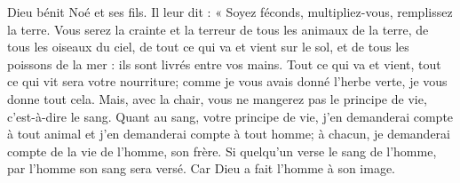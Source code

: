 Dieu bénit Noé et ses fils.
Il leur dit : « Soyez féconds, multipliez-vous, remplissez la terre.
Vous serez la crainte et la terreur de tous les animaux de la terre,
	de tous les oiseaux du ciel, de tout ce qui va et vient sur le sol,
	et de tous les poissons de la mer : ils sont livrés entre vos mains.
Tout ce qui va et vient, tout ce qui vit sera votre nourriture;
	comme je vous avais donné l’herbe verte, je vous donne tout cela.
Mais, avec la chair, vous ne mangerez pas le principe de vie,
	c’est-à-dire le sang.
Quant au sang, votre principe de vie, j’en demanderai compte à tout animal
	et j’en demanderai compte à tout homme;
	à chacun, je demanderai compte de la vie de l’homme, son frère.
Si quelqu’un verse le sang de l’homme, par l’homme son sang sera versé.
	Car Dieu a fait l’homme à son image.
